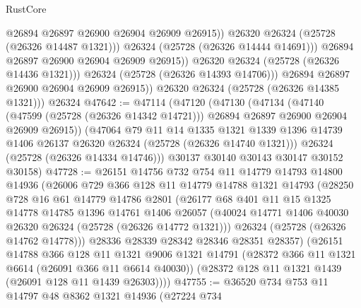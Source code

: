 \begin{lexlean}{RustCore}
\begin{coremodule}
                          @26894
                          @26897
                          @26900
                          @26904
                          @26909
                          @26915))
                      @26320
                      @26324
                      (@25728 (@26326 @14487 @1321)))
                    @26324
                    (@25728 (@26326 @14444 @14691)))
                  @26894
                  @26897
                  @26900
                  @26904
                  @26909
                  @26915))
              @26320
              @26324
              (@25728 (@26326 @14436 @1321)))
            @26324
            (@25728 (@26326 @14393 @14706)))
          @26894
          @26897
          @26900
          @26904
          @26909
          @26915))
      @26320
      @26324
      (@25728 (@26326 @14385 @1321)))
    @26324
@47642 := @47114
    (@47120
      (@47130
        (@47134
          (@47140
            (@47599 (@25728 (@26326 @14342 @14721)))
            @26894
            @26897
            @26900
            @26904
            @26909
            @26915))
        (@47064
          @79
          @11
          @14
          @1335
          @1321
          @1339
          @1396
          @14739
          @1406
          @26137
          @26320
          @26324
          (@25728 (@26326 @14740 @1321)))
        @26324
        (@25728 (@26326 @14334 @14746)))
      @30137
      @30140
      @30143
      @30147
      @30152
      @30158)
@47728 := @26151
    @14756
    @732
    @754
    @11
    @14779
    @14793
    @14800
    @14936
    (@26006
      @729
      @366
      @128
      @11
      @14779
      @14788
      @1321
      @14793
      (@28250
        @728
        @16
        @61
        @14779
        @14786
        @2801
        (@26177
          @68
          @401
          @11
          @15
          @1325
          @14778
          @14785
          @1396
          @14761
          @1406
          @26057
          (@40024 @14771 @1406 @40030 @26320 @26324 (@25728 (@26326 @14772 @1321)))
          @26324
          (@25728 (@26326 @14762 @14778)))
        @28336
        @28339
        @28342
        @28346
        @28351
        @28357)
      (@26151
        @14788
        @366
        @128
        @11
        @1321
        @9006
        @1321
        @14791
        (@28372 @366 @11 @1321 @6614 (@26091 @366 @11 @6614 @40030))
        (@28372 @128 @11 @1321 @1439 (@26091 @128 @11 @1439 @26303))))
@47755 := @36520
    @734
    @753
    @11
    @14797
    @48
    @8362
    @1321
    @14936
    (@27224
      @734

\end{coremodule}
\end{lexlean}

